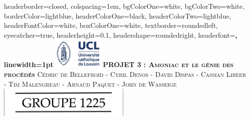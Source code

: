 \documentclass[landscape,a0paper,fontscale=0.285]{baposter} %
\begin{document}
\begin{poster}
{
headerborder=closed, %
colspacing=1em, %
bgColorOne=white, %
bgColorTwo=white, %
borderColor=lightblue, %
headerColorOne=black, %
headerColorTwo=lightblue, %
headerFontColor=white, %
boxColorOne=white, %
textborder=roundedleft, %
eyecatcher=true, %
headerheight=0.1\textheight, %
headershape=roundedright, %
headerfont=\Large\bf\textsc, %
linewidth=1pt %
}
%
{\includegraphics[height=4em]{UCL.jpg}} %
{\bf\textsc{PROJET 3 : Amoniac et le g\'enie des proc\'ed\'es}\vspace{0.5em}} %
{\textsc{\small Cédric de Bellefroid - Cyril Denos - David Dispas  - Cassian Libeer  - Tim Malengreau - Arnaud Paquet - John de Wasseige}} %
{\includegraphics[height=4em]{groupe.png}} %



\end{poster}
\end{document}
